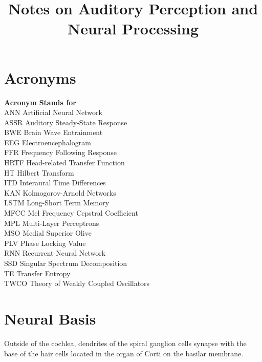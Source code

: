 \documentclass{article}
\title{Notes on Auditory Perception and Neural Processing}
\author{}
\date{}
\begin{document}
\maketitle

\newpage

\tableofcontents

\newpage

\section{Acronyms}

\begin{tabbing}
    \textbf{Acronym} \hspace{3cm} \= \textbf{Stands for} \\
    ANN \> Artificial Neural Network \\
    ASSR \> Auditory Steady-State Response \\
    BWE \> Brain Wave Entrainment \\
    EEG \> Electroencephalogram \\
    FFR \> Frequency Following Response \\
    HRTF \> Head-related Transfer Function \\
    HT \> Hilbert Transform \\
    ITD \> Interaural Time Differences \\
    KAN \> Kolmogorov-Arnold Networks \\
    LSTM \> Long-Short Term Memory \\
    MFCC \> Mel Frequency Cepstral Coefficient \\
    MPL \> Multi-Layer Perceptrons \\
    MSO \> Medial Superior Olive \\
    PLV \> Phase Locking Value \\
    RNN \> Recurrent Neural Network \\
    SSD \> Singular Spectrum Decomposition \\
    TE \> Transfer Entropy \\
    TWCO \> Theory of Weakly Coupled Oscillators \\
\end{tabbing}

\newpage

\section{Neural Basis}
Outside of the cochlea, dendrites of the spiral ganglion cells synapse with the base of the hair cells located in the organ of Corti on the basilar membrane. 
\end{document}
